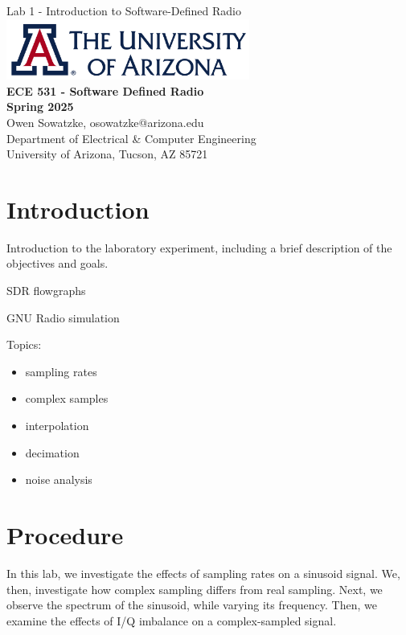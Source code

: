 \documentclass{article}
\begin{document}
\begin{titlepage}
	\centering
	{\huge Lab 1 - Introduction to Software-Defined Radio}\\[0.25 in]
	\includegraphics[width=0.6\textwidth]{ua_logo.png}\\[0.25 in]
	{\large \textbf{ECE 531 - Software Defined Radio\\[0.25 in]
	Spring 2025\\[0.25 in]}}
	{\large Owen Sowatzke, osowatzke@arizona.edu\\[0.05 in]
	Department of Electrical \& Computer Engineering\\[0.05 in]
	University of Arizona, Tucson, AZ 85721\\[0.5 in]}
	\textcolor{blue}{
	\noindent\hrulefill
	\tableofcontents
	\noindent\hrulefill
	}
\end{titlepage}

\section{Introduction}
Introduction to the laboratory experiment, including a brief description of the objectives and goals.

SDR flowgraphs 

GNU Radio simulation

Topics:

\begin{itemize}
	\item sampling rates
	\item complex samples
	\item interpolation
	\item decimation
	\item noise analysis
\end{itemize}

\section{Procedure}

In this lab, we investigate the effects of sampling rates on a sinusoid signal. We, then, investigate how complex sampling differs from real sampling. Next, we observe the spectrum of the sinusoid, while varying its frequency. Then, we examine the effects of I/Q imbalance on a complex-sampled signal.
\end{document}
